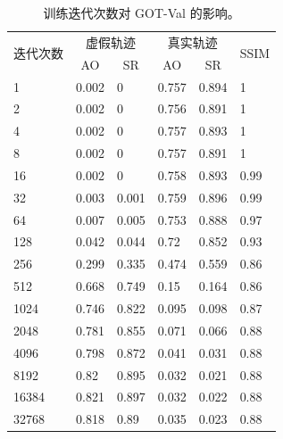 \begin{table}[t!]
\centering
\caption{训练迭代次数对 GOT-Val 的影响。}
\begin{tabular}{@{}llllll@{}}
\toprule
\multirow{2}{*}{迭代次数} & \multicolumn{2}{c}{虚假轨迹} & \multicolumn{2}{c}{真实轨迹} & \multirow{2}{*}{SSIM}\\ \cmidrule(lr){2-3} \cmidrule(lr){4-5}
 & \multicolumn{1}{c}{AO} & \multicolumn{1}{c}{SR} & \multicolumn{1}{c}{AO} & \multicolumn{1}{c}{SR} &  \\ \midrule
1 & 0.002 & 0 & 0.757 & 0.894 & 1   \\
2 & 0.002 & 0 & 0.756 & 0.891 & 1   \\
4 & 0.002 & 0 & 0.757 & 0.893 & 1   \\
8 & 0.002 & 0 & 0.757 & 0.891 & 1   \\
16 & 0.002 & 0 & 0.758 & 0.893 & 0.99 \\
32 & 0.003 & 0.001 & 0.759 & 0.896 & 0.99 \\
64 & 0.007 & 0.005 & 0.753 & 0.888 & 0.97 \\
128 & 0.042 & 0.044 & 0.72 & 0.852 & 0.93 \\
256 & 0.299 & 0.335 & 0.474 & 0.559 & 0.86 \\
512 & 0.668 & 0.749 & 0.15 & 0.164 & 0.86 \\
1024 & 0.746 & 0.822 & 0.095 & 0.098 & 0.87 \\
2048 & 0.781 & 0.855 & 0.071 & 0.066 & 0.88 \\
4096 & 0.798 & 0.872 & 0.041 & 0.031 & 0.88 \\
8192 & 0.82 & 0.895 & 0.032 & 0.021 & 0.88 \\
16384 & 0.821 & 0.897 & 0.032 & 0.022 & 0.88 \\
32768 & 0.818 & 0.89 & 0.035 & 0.023 & 0.88 \\ \bottomrule
\end{tabular}
\label{tab:attack_iter}
\end{table}

